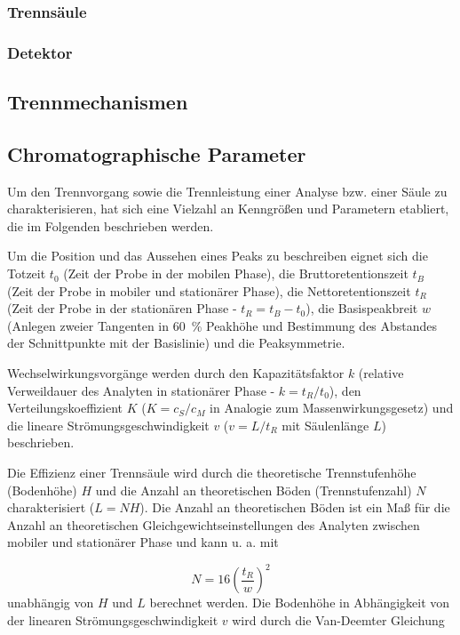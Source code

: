      \subsubsection{Trennsäule}
     
     \subsubsection{Detektor}
     
  \subsection{Trennmechanismen}
    
  \subsection{Chromatographische Parameter}
    
    Um den Trennvorgang sowie die Trennleistung einer Analyse bzw. einer Säule zu charakterisieren, hat sich eine Vielzahl an Kenngrößen und Parametern etabliert, die im Folgenden beschrieben werden.
    
     Um die Position und das Aussehen eines Peaks zu beschreiben eignet sich die Totzeit $t_0$ (Zeit der Probe in der mobilen Phase), die Bruttoretentionszeit $t_B$ (Zeit der Probe in mobiler und stationärer Phase), die Nettoretentionszeit $t_R$ (Zeit der Probe in der stationären Phase - $t_R = t_B - t_0$), die Basispeakbreit $w$ (Anlegen zweier Tangenten in \SI[mode=text]{60}{\percent} Peakhöhe und Bestimmung des Abstandes der Schnittpunkte mit der Basislinie) und die Peaksymmetrie. 
    
    Wechselwirkungsvorgänge werden durch den Kapazitätsfaktor $k$ (relative Verweildauer des Analyten in stationärer Phase - $k = t_R / t_0$), den Verteilungskoeffizient $K$ ($K = c_S / c_M$ in Analogie zum Massenwirkungsgesetz) und die lineare Strömungsgeschwindigkeit $v$ ($v = L / t_R$ mit Säulenlänge $L$) beschrieben. 
    
    Die Effizienz einer Trennsäule wird durch die theoretische Trennstufenhöhe (Bodenhöhe) $H$ und die Anzahl an theoretischen Böden (Trennstufenzahl) $N$ charakterisiert ($L = N H$). Die Anzahl an theoretischen Böden ist ein Maß für die Anzahl an theoretischen Gleichgewichtseinstellungen des Analyten zwischen mobiler und stationärer Phase und kann u. a. mit 
    
      \begin{equation}
        N = 16 \left(\frac{t_R}{w}\right)^2
      \end{equation} 
    unabhängig von $H$ und $L$ berechnet werden. Die Bodenhöhe in Abhängigkeit von der linearen Strömungsgeschwindigkeit $v$ wird durch die Van-Deemter Gleichung 
    
